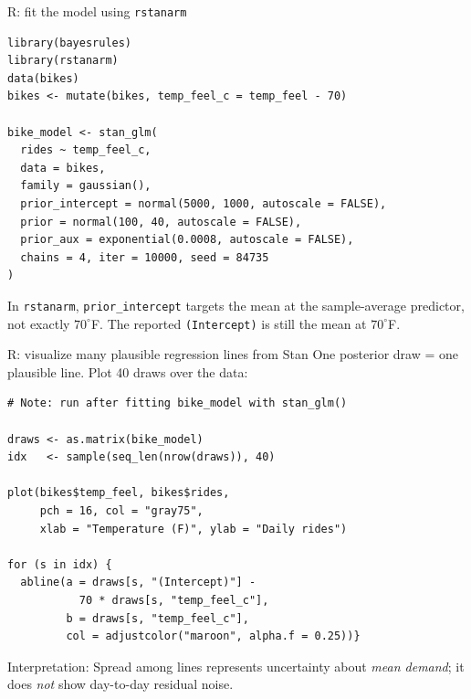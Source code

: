 \documentclass[aspectratio=43,11pt]{beamer}
\begin{document}
\begin{frame}[fragile]{R: fit the model using \texttt{rstanarm}}
\footnotesize
\begin{verbatim}
library(bayesrules)
library(rstanarm)
data(bikes)
bikes <- mutate(bikes, temp_feel_c = temp_feel - 70)

bike_model <- stan_glm(
  rides ~ temp_feel_c,
  data = bikes,
  family = gaussian(),
  prior_intercept = normal(5000, 1000, autoscale = FALSE),
  prior = normal(100, 40, autoscale = FALSE),
  prior_aux = exponential(0.0008, autoscale = FALSE),
  chains = 4, iter = 10000, seed = 84735
)
\end{verbatim}
\par\smallskip\scriptsize
In \texttt{rstanarm}, \texttt{prior\_intercept} targets the mean at the
sample-average predictor, not exactly $70^\circ$F. The reported
\texttt{(Intercept)} is still the mean at $70^\circ$F.
\end{frame}

{
\begin{frame}[fragile]{R: visualize many plausible regression lines from Stan}
\small
{One posterior draw = one plausible line.} Plot 40 draws over the data:
\begin{verbatim}
# Note: run after fitting bike_model with stan_glm()

draws <- as.matrix(bike_model)
idx   <- sample(seq_len(nrow(draws)), 40)

plot(bikes$temp_feel, bikes$rides,
     pch = 16, col = "gray75",
     xlab = "Temperature (F)", ylab = "Daily rides")

for (s in idx) {
  abline(a = draws[s, "(Intercept)"] -
           70 * draws[s, "temp_feel_c"],
         b = draws[s, "temp_feel_c"],
         col = adjustcolor("maroon", alpha.f = 0.25))}

\end{verbatim}
\vspace{-2mm}
\footnotesize
{Interpretation:} Spread among lines represents uncertainty about
\emph{mean demand}; it does \emph{not} show day-to-day residual noise.
\end{frame}
}
\end{document}
